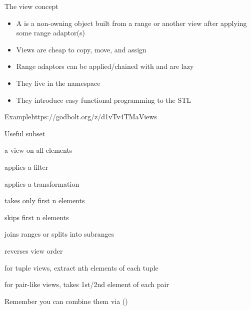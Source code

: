 \begin{frame}[fragile]
  \begin{block}{The view concept}
    \begin{itemize}
    \item A  is a non-owning object built from a range or another view after applying some range adaptor(s)
    \item Views are cheap to copy, move, and assign
    \item Range adaptors can be applied/chained with \cppinline{|} and are lazy
    \item They live in the  namespace
    \item They introduce easy functional programming to the STL
    \end{itemize}
  \end{block}
  \begin{exampleblockGB}{Example}{https://godbolt.org/z/d1vTv4TMa}{Views}
    { \small
    }
  \end{exampleblockGB}
\end{frame}

\begin{frame}[fragile]
  \begin{block}{Useful subset}
    \begin{description}
    \item[all] a view on all elements
    \item[filter] applies a filter
    \item[transform] applies a transformation
    \item[take] takes only first n elements
    \item[drop] skips first n elements
    \item[join/split] joins ranges or splits into subranges
    \item[reverse] reverses view order
    \item[elements] for tuple views, extract nth elements of each tuple
    \item[keys/values] for pair-like views, takes 1st/2nd element of each pair
    \end{description}
  \end{block}
  Remember you can combine them via (\cppinline{|})
\end{frame}

